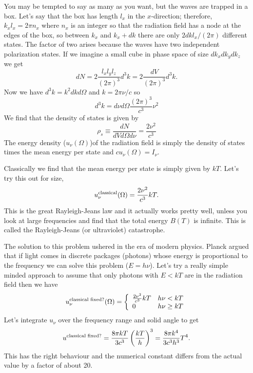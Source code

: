 You may be tempted to say as many as you want, but the waves are
trapped in a box.  Let's say that the box has length $l_x$ in the
$x$-direction; therefore, $k_x l_x = 2 \pi n_x$ where $n_x$ is an
integer so that the radiation field has a node at the edges of the
box, so between $k_x$ and $k_x + dk$ there are only $2 dk l_x / (2\pi)$
different states.  The factor of two arises because the waves have two
independent polarization states.   If we imagine a small cube in phase
space of size $d k_x d k_y d k_z$ we get 
\begin{equation}
d N = 2 \frac{l_x l_y l_z }{(2\pi)^3} d^3 k = 2 \frac{d V}{(2\pi)^3} d^3 k.
\label{eq:29}
\end{equation}
Now we have $d^3 k = k^2 dk d \Omega$ and $k=2\pi \nu/c$ so
\begin{equation}
d^3 k = d \nu d\Omega \frac{(2\pi)^3}{c^3} \nu^2
\label{eq:30}
\end{equation}
We find that the density of states is given by
\begin{equation}
\rho_s \equiv \frac{d N}{d V d\Omega d \nu} = \frac{2 \nu^2}{c^3}
\label{eq:31}
\end{equation}
The energy density ($u_\nu(\Omega)$)of the radiation field is simply the density of
states times the mean energy per state and $c u_\nu(\Omega)=I_\nu$.

Classically we find that the mean energy per state is simply given by 
$k T$.  Let's try this out for size,
\begin{equation}
u^{\hbox{\rm \scriptsize classical}}_\nu (\Omega) = \frac{2\nu^2}{c^3} k T.
\label{eq:32}
\end{equation}
This is the great Rayleigh-Jeans law and it actually works pretty
well, unless you look at large frequencies and find that the total
energy $B(T)$ is infinite.  This is called the Rayleigh-Jeans (or
ultraviolet) catastrophe.

The solution to this problem ushered in the era of modern physics.
Planck argued that if light comes in discrete packages (photons) whose
energy is proportional to the frequency we can solve this problem
($E=h\nu$).  Let's try a really simple minded approach to assume that
only photons with $E<kT$ are in the radiation field then we have
\begin{equation}
u^{\hbox{\rm \scriptsize classical fixed?}}_\nu(\Omega) = 
\left \{ \begin{array}{ll}
	\frac{2\nu^2}{c^3} k T & h \nu < k T \\
	0 & h \nu \geq k T 
	\end{array}
\right .
\label{eq:33}
\end{equation}
Let's integrate $u_\nu$ over the frequency range and solid angle to get
\begin{equation}
u^{\hbox{\rm \scriptsize classical fixed?}} = 
\frac{8\pi k T }{3 c^3} \left ( \frac{k T}{h} \right )^3
= \frac{8 \pi k^4}{3 c^3 h^3} T^4.
\label{eq:34}
\end{equation}
This has the right behaviour and the numerical constant differs from
the actual value by a factor of about 20.

